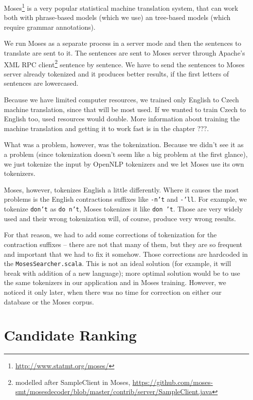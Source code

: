 Moses\footnote{\url{http://www.statmt.org/moses/}} is a very popular statistical machine translation system, that can work both with phrase-based models (which we use) an tree-based models (which require grammar annotations).

We run Moses as a separate process in a server mode and then the sentences to translate are sent to it. The sentences are sent to Moses server through Apache's XML RPC client\footnote{modelled after SampleClient in Moses, \url{https://github.com/moses-smt/mosesdecoder/blob/master/contrib/server/SampleClient.java}} sentence by sentence. We have to send the sentences to Moses server already tokenized and it produces better results, if the first letters of sentences are lowercased.

Because we have limited computer resources, we trained only English to Czech machine translation, since that will be most used. If we wanted to train Czech to English too, used resources would double. More information about training the machine translation and getting it to work fast is in the chapter ???.

What was a problem, however, was the tokenization. Because we didn't see it as a problem (since tokenization doesn't seem like a big problem at the first glance), we just tokenize the input by OpenNLP tokenizers and we let Moses use its own tokenizers.

Moses, however, tokenizes English a little differently. Where it causes the most problems is the English contractions suffixes like \texttt{-n't} and \texttt{-'ll}. For example, we tokenize \texttt{don't} as \texttt{do n't}, Moses tokenizes it like \texttt{don 't}. Those are very widely used and their wrong tokenization will, of course, produce very wrong results.

For that reason, we had to add some corrections of tokenization for the contraction suffixes -- there are not that many of them, but they are so frequent and important that we had to fix it somehow. Those corrections are hardcoded in the \texttt{MosesSearcher.scala}. This is not an ideal solution (for example, it will break with addition of a new language); more optimal solution would be to use the same tokenizers in our application and in Moses training. However, we noticed it only later, when there was no time for correction on either our database or the Moses corpus.


\section{Candidate Ranking}
\label{sec:ranking}

